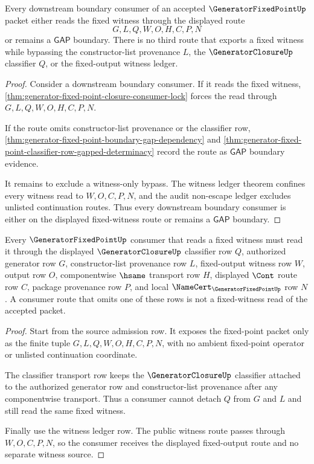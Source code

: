 \begin{theorem}
\label{thm:generator-fixed-point-boundary-consumer-totality}
Every downstream boundary consumer of an accepted $\GeneratorFixedPointUp$ packet either reads the fixed witness through the displayed route
$$
G,L,Q,W,O,H,C,P,N
$$
or remains a $\mathsf{GAP}$ boundary. There is no third route that exports a fixed witness while bypassing the constructor-list provenance $L$, the $\GeneratorClosureUp$ classifier $Q$, or the fixed-output witness ledger.
\end{theorem}
\begin{proof}
Consider a downstream boundary consumer. If it reads the fixed witness, \autoref{thm:generator-fixed-point-closure-consumer-lock} forces the read through $G,L,Q,W,O,H,C,P,N$.

If the route omits constructor-list provenance or the classifier row, \autoref{thm:generator-fixed-point-boundary-gap-dependency} and \autoref{thm:generator-fixed-point-classifier-row-gapped-determinacy} record the route as $\mathsf{GAP}$ boundary evidence.

It remains to exclude a witness-only bypass. The witness ledger theorem confines every witness read to $W,O,C,P,N$, and the audit non-escape ledger excludes unlisted continuation routes. Thus every downstream boundary consumer is either on the displayed fixed-witness route or remains a $\mathsf{GAP}$ boundary.
\end{proof}

\begin{theorem}
\label{thm:generator-fixed-point-closure-consumer-lock}
Every $\GeneratorFixedPointUp$ consumer that reads a fixed witness must read it through the displayed $\GeneratorClosureUp$ classifier row $Q$, authorized generator row $G$, constructor-list provenance row $L$, fixed-output witness row $W$, output row $O$, componentwise $\hsame$ transport row $H$, displayed $\Cont$ route row $C$, package provenance row $P$, and local $\NameCert_{\GeneratorFixedPointUp}$ row $N$. A consumer route that omits one of these rows is not a fixed-witness read of the accepted packet.
\end{theorem}
\begin{proof}
Start from the source admission row. It exposes the fixed-point packet only as the finite tuple $G,L,Q,W,O,H,C,P,N$, with no ambient fixed-point operator or unlisted continuation coordinate.

The classifier transport row keeps the $\GeneratorClosureUp$ classifier attached to the authorized generator row and constructor-list provenance after any componentwise transport. Thus a consumer cannot detach $Q$ from $G$ and $L$ and still read the same fixed witness.

Finally use the witness ledger row. The public witness route passes through $W,O,C,P,N$, so the consumer receives the displayed fixed-output route and no separate witness source.
\end{proof}

